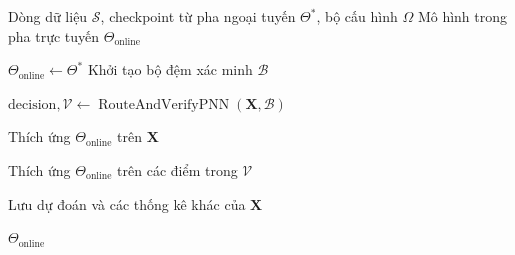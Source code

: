 








\begin{algorithm}[H]
\caption{Pha thích ứng trực tuyến}
\label{alg:online-adaptation}
\begin{algorithmic}[1]

\Require Dòng dữ liệu $\mathcal{S}$, checkpoint từ pha ngoại tuyến $\Theta^{*}$, bộ cấu hình $\Omega$
\Ensure Mô hình trong pha trực tuyến $\Theta_{\mathrm{online}}$

\State $\Theta_{\mathrm{online}} \gets \Theta^{*}$
\State Khởi tạo bộ đệm xác minh $\mathcal{B}$


    \State $\mathrm{decision}, \mathcal{V}
    \gets
    \operatorname{RouteAndVerifyPNN}
    \left(\mathbf{X}, \mathcal{B}\right)$

        \State Thích ứng $\Theta_{\mathrm{online}}$ trên $\mathbf{X}$
    \EndIf

        \State Thích ứng $\Theta_{\mathrm{online}}$ trên các điểm trong $\mathcal{V}$
    \EndIf

    \State Lưu dự đoán và các thống kê khác của $\mathbf{X}$

\EndFor

\State \Return $\Theta_{\mathrm{online}}$

\end{algorithmic}
\end{algorithm}

